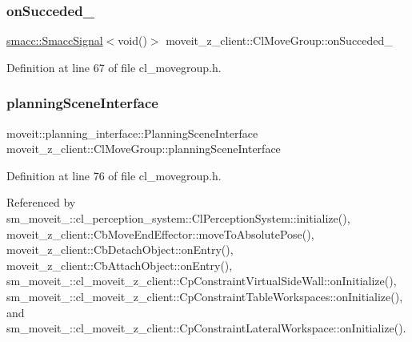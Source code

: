 \subsubsection{\texorpdfstring{on\+Succeded\+\_\+}{onSucceded\_}}
{\footnotesize\ttfamily \hyperlink{classsmacc_1_1SmaccSignal}{smacc\+::\+Smacc\+Signal}$<$void()$>$ moveit\+\_\+z\+\_\+client\+::\+Cl\+Move\+Group\+::on\+Succeded\+\_\+\hspace{0.3cm}{\ttfamily [private]}}



Definition at line 67 of file cl\+\_\+movegroup.\+h.

\mbox{\label{classmoveit__z__client_1_1ClMoveGroup_a21c879b2683286aa21ce68f40195b4b5}} 
\subsubsection{\texorpdfstring{planning\+Scene\+Interface}{planningSceneInterface}}
{\footnotesize\ttfamily moveit\+::planning\+\_\+interface\+::\+Planning\+Scene\+Interface moveit\+\_\+z\+\_\+client\+::\+Cl\+Move\+Group\+::planning\+Scene\+Interface}



Definition at line 76 of file cl\+\_\+movegroup.\+h.



Referenced by sm\+\_\+moveit\+\_\+::cl\+\_\+perception\+\_\+system\+::\+Cl\+Perception\+System\+::initialize(), moveit\+\_\+z\+\_\+client\+::\+Cb\+Move\+End\+Effector\+::move\+To\+Absolute\+Pose(), moveit\+\_\+z\+\_\+client\+::\+Cb\+Detach\+Object\+::on\+Entry(), moveit\+\_\+z\+\_\+client\+::\+Cb\+Attach\+Object\+::on\+Entry(), sm\+\_\+moveit\+\_\+::cl\+\_\+moveit\+\_\+z\+\_\+client\+::\+Cp\+Constraint\+Virtual\+Side\+Wall\+::on\+Initialize(), sm\+\_\+moveit\+\_\+::cl\+\_\+moveit\+\_\+z\+\_\+client\+::\+Cp\+Constraint\+Table\+Workspaces\+::on\+Initialize(), and sm\+\_\+moveit\+\_\+::cl\+\_\+moveit\+\_\+z\+\_\+client\+::\+Cp\+Constraint\+Lateral\+Workspace\+::on\+Initialize().

\mbox{\label{classmoveit__z__client_1_1ClMoveGroup_afecfdc1860dffea3331379b90d608154}} 
